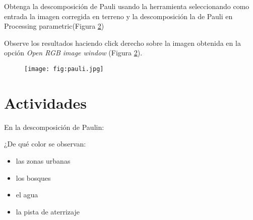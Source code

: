 Obtenga la descomposición de Pauli usando la herramienta  seleccionando como entrada la imagen corregida en terreno y la descomposición la de Pauli en Processing parametric(Figura \ref{fig:pauli})

\begin{figure}[h!]
    \centering
    \hfill
    \caption{}
    \label{fig:pauli}
\end{figure}

Observe los resultados haciendo click derecho sobre la imagen obtenida en la opción \emph{Open RGB image window} (Figura \ref{fig:pauli}).

\begin{figure}[h!]
    \centering
    \texttt{[image: fig:pauli.jpg]}
    \caption{}
    \label{fig:pauli}
\end{figure}

\section{Actividades}
En la descomposición de Paulin:
\begin{que}
    ¿De qué color  se observan:
\begin{itemize}
  \item las zonas urbanas
  \item los bosques
  \item el agua
  \item la pista de aterrizaje
\end{itemize}

\end{que}

